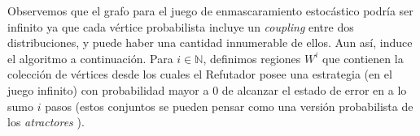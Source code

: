 Observemos que el grafo para el juego de enmascaramiento estocástico podría ser infinito ya que cada vértice probabilista incluye un \textit{coupling} entre dos distribuciones, y puede haber una cantidad innumerable de ellos.
Aun así, induce el algoritmo a continuación.
%
Para $i\in \mathbb{N}$, definimos regiones $W^i$ que contienen la colección de vértices desde los cuales el Refutador posee una estrategia (en el juego infinito) con probabilidad mayor a $0$ de alcanzar el estado de error en a lo sumo $i$ pasos (estos conjuntos se pueden pensar como una versión probabilista de los \emph{atractores} \cite{Jurd11}).



